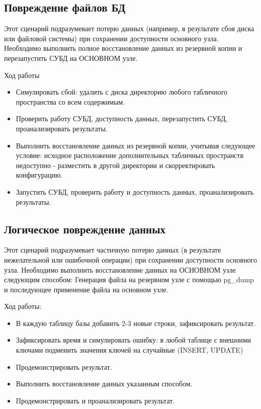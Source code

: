 \subsection{Повреждение файлов БД}
Этот сценарий подразумевает потерю данных (например, в результате сбоя диска или файловой системы) при сохранении доступности основного узла. Необходимо выполнить полное восстановление данных из резервной копии и перезапустить СУБД на ОСНОВНОМ узле.

Ход работы

\begin{itemize}
\item Симулировать сбой: удалить с диска директорию любого табличного пространства со всем содержимым.
\item Проверить работу СУБД, доступность данных, перезапустить СУБД, проанализировать результаты.
\item Выполнить восстановление данных из резервной копии, учитывая следующее условие: исходное расположение дополнительных табличных пространств недоступно - разместить в другой директории и скорректировать конфигурацию.
\item Запустить СУБД, проверить работу и доступность данных, проанализировать результаты.
\end{itemize}


\subsection{Логическое повреждение данных}
Этот сценарий подразумевает частичную потерю данных (в результате нежелательной или ошибочной операции)
при сохранении доступности основного узла. Необходимо выполнить восстановление данных на ОСНОВНОМ узле следующим способом: Генерация файла на резервном узле с помощью pg\_dump и последующее применение файла на основном узле.

Ход работы:

\begin{itemize}
    \item В каждую таблицу базы добавить 2-3 новые строки, зафиксировать результат.
    \item Зафиксировать время и симулировать ошибку: в любой таблице с внешними ключами подменить значения ключей на случайные (INSERT, UPDATE)
    \item Продемонстрировать результат.
    \item Выполнить восстановление данных указанным способом.
    \item Продемонстрировать и проанализировать результат.
\end{itemize}


